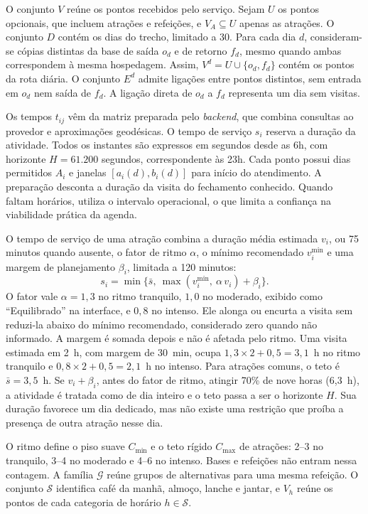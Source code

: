 O conjunto $V$ reúne os pontos recebidos pelo serviço. Sejam $U$ os pontos opcionais, que incluem atrações e refeições, e $V_A\subseteq U$ apenas as atrações. O conjunto $D$ contém os dias do trecho, limitado a 30. Para cada dia $d$, consideram-se cópias distintas da base de saída $o_d$ e de retorno $f_d$, mesmo quando ambas correspondem à mesma hospedagem. Assim, $V^d=U\cup\{o_d,f_d\}$ contém os pontos da rota diária. O conjunto $E^d$ admite ligações entre pontos distintos, sem entrada em $o_d$ nem saída de $f_d$. A ligação direta de $o_d$ a $f_d$ representa um dia sem visitas.

Os tempos $t_{ij}$ vêm da matriz preparada pelo \textit{backend}, que combina consultas ao provedor e aproximações geodésicas. O tempo de serviço $s_i$ reserva a duração da atividade. Todos os instantes são expressos em segundos desde as 6h, com horizonte $H=61.200$ segundos, correspondente às 23h. Cada ponto possui dias permitidos $A_i$ e janelas $[a_i(d),b_i(d)]$ para início do atendimento. A preparação desconta a duração da visita do fechamento conhecido. Quando faltam horários, utiliza o intervalo operacional, o que limita a confiança na viabilidade prática da agenda.

O tempo de serviço de uma atração combina a duração média estimada $v_i$, ou 75 minutos quando ausente, o fator de ritmo $\alpha$, o mínimo recomendado $v_i^{\min}$ e uma margem de planejamento $\beta_i$, limitada a 120 minutos:
\begin{equation}
s_i=\min\bigl\{\bar{s},\ \max(v_i^{\min},\ \alpha\,v_i)+\beta_i\bigr\}.
\label{eq:servico}
\end{equation}
O fator vale $\alpha=1{,}3$ no ritmo tranquilo, $1{,}0$ no moderado, exibido como ``Equilibrado'' na interface, e $0{,}8$ no intenso. Ele alonga ou encurta a visita sem reduzi-la abaixo do mínimo recomendado, considerado zero quando não informado. A margem é somada depois e não é afetada pelo ritmo. Uma visita estimada em 2~h, com margem de 30~min, ocupa $1{,}3\times2+0{,}5=3{,}1$~h no ritmo tranquilo e $0{,}8\times2+0{,}5=2{,}1$~h no intenso. Para atrações comuns, o teto é $\bar{s}=3{,}5$~h. Se $v_i+\beta_i$, antes do fator de ritmo, atingir 70\% de nove horas (6,3~h), a atividade é tratada como de dia inteiro e o teto passa a ser o horizonte $H$. Sua duração favorece um dia dedicado, mas não existe uma restrição que proíba a presença de outra atração nesse dia.

O ritmo define o piso suave $C_{\min}$ e o teto rígido $C_{\max}$ de atrações: 2--3 no tranquilo, 3--4 no moderado e 4--6 no intenso. Bases e refeições não entram nessa contagem. A família $\mathcal{G}$ reúne grupos de alternativas para uma mesma refeição. O conjunto $\mathcal{S}$ identifica café da manhã, almoço, lanche e jantar, e $V_h$ reúne os pontos de cada categoria de horário $h\in\mathcal{S}$.

